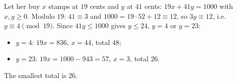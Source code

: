 Let her buy $x$ stamps at $19$ cents and $y$ at $41$ cents: $19x+41y=1000$ with $x,y\ge0$. Modulo $19$: $41\equiv3$ and $1000=19\cdot52+12\equiv12$, so $3y\equiv12$, i.e.\ $y\equiv4\pmod{19}$. Since $41y\le1000$ gives $y\le24$, $y=4$ or $y=23$:
\begin{itemize}
\item $y=4$: $19x=836$, $x=44$, total $48$;
\item $y=23$: $19x=1000-943=57$, $x=3$, total $26$.
\end{itemize}
The smallest total is $\boxed{26}$.

